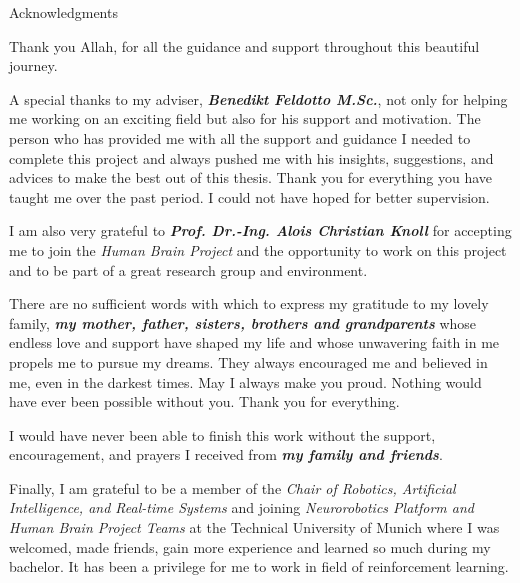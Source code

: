\thispagestyle{empty}

\vspace*{10mm}

\begin{center}
{ Acknowledgments}
\end{center}

\vspace{5mm}

\begin{center}
Thank you Allah, for all the guidance and support throughout this beautiful journey.
\end{center} 


A special thanks to my adviser, \textit{\textbf{Benedikt Feldotto M.Sc.}}, not only for helping me working on an exciting field but also for his support and motivation. The person who has provided me with all the support and guidance I needed to complete this project and always pushed me with his insights, suggestions, and advices to make the best out of this thesis. Thank you for everything you have taught me over the past period. I could not have hoped for better supervision.

I am also very grateful to \textit{\textbf{Prof. Dr.-Ing. Alois Christian Knoll}} for accepting me to join the \textit{Human Brain Project} and the opportunity to work on this project and to be part of a great research group and environment.

There are no sufficient words with which to express my gratitude to my lovely family, \textit{\textbf{my mother, father, sisters, brothers and grandparents}} whose endless love and support have shaped my life and whose unwavering faith in me propels me to pursue my dreams. They always encouraged me and believed in me, even in the darkest times. May I always make you proud. Nothing would have ever been possible without you. Thank you for everything.

I would have never been able to finish this work without the support, encouragement, and prayers I received from \textit{\textbf{my family and friends}}.

Finally, I am grateful to be a member of the \textit{Chair of Robotics, Artificial Intelligence, and Real-time Systems} and joining \textit{Neurorobotics Platform and Human Brain Project Teams} at the Technical University of Munich where I was welcomed, made friends, gain more experience and learned so much during my bachelor. It has been a privilege for me to work in field of reinforcement learning.
